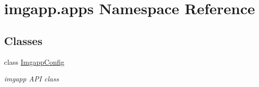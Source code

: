 \hypertarget{namespaceimgapp_1_1apps}{}\section{imgapp.\+apps Namespace Reference}
\label{namespaceimgapp_1_1apps}
\subsection*{Classes}
\begin{DoxyCompactItemize}
\item 
class \hyperlink{classimgapp_1_1apps_1_1ImgappConfig}{Imgapp\+Config}
\begin{DoxyCompactList}\small\item\em imgapp A\+PI class \end{DoxyCompactList}\end{DoxyCompactItemize}
